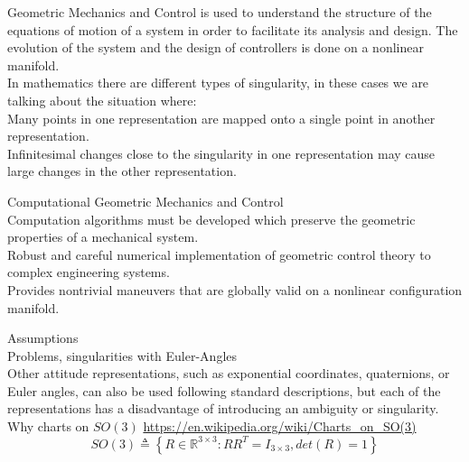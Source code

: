 Geometric Mechanics and Control is used to understand the structure of the equations of motion of a system in order to facilitate its analysis and design. The evolution of the system and the design of controllers is done on a nonlinear manifold.\\

In mathematics there are different types of singularity, in these cases we are talking about the situation where:\\
Many points in one representation are mapped onto a single point in another representation.\\
Infinitesimal changes close to the singularity in one representation may cause large changes in the other representation.

Computational Geometric Mechanics and Control\\
Computation algorithms must be developed which preserve the geometric properties of a mechanical system.\\
Robust and careful numerical implementation of geometric control theory to complex engineering systems.\\
Provides nontrivial maneuvers that are globally valid on a nonlinear configuration manifold.

Assumptions\\

Problems, singularities with Euler-Angles\\
Other attitude representations, such as exponential coordinates, quaternions, or Euler
angles, can also be used following standard descriptions, but each of the representations has a disadvantage
of introducing an ambiguity or singularity.
Why charts on $ SO(3) $ \url{https://en.wikipedia.org/wiki/Charts_on_SO(3)}\\

\begin{equation}\label{key}
SO(3) \triangleq \left\lbrace R\in\mathbb{R}^{3\times3}:RR^T=I_{3\times3},det(R)=1\right\rbrace 
\end{equation}

